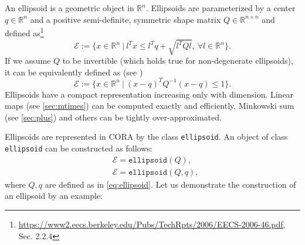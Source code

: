  \label{sec:ellipsoids}

An ellipsoid is a geometric object in $\mathbb{R}^n$. Ellipsoids are parameterized by a center $q \in \mathbb{R}^n$ and a positive semi-definite, symmetric shape matrix $Q\in \mathbb{R}^{n\times n}$ and defined as\footnote{\href{Ellipsoidal Toolbox (Technical Report)}{https://www2.eecs.berkeley.edu/Pubs/TechRpts/2006/EECS-2006-46.pdf},  Sec. 2.2.4}
\begin{equation} \label{eq:ellipsoid}
	\mathcal{E} := \Big\{x\in \mathbb{R}^n ~ \Big| ~ l^Tx \leq l^Tq + \sqrt{l^TQl}, \ \forall l \in \mathbb{R}^n \Big \}.
\end{equation}
If we assume $Q$ to be invertible (which holds true for non-degenerate ellipsoids), it can be equivalently defined as (see \cite[Definition 2.1.3]{Kurzhanskiy2006})
\begin{equation*}
	\mathcal{E} := \Big\{ x\in \mathbb{R}^n ~ \Big| ~ \left(x-q\right)^T Q^{-1}\left(x-q\right)\leq 1 \Big \}.
\end{equation*}
Ellipsoids have a compact representation increasing only with dimension. Linear maps (see \cref{sec:mtimes}) can be computed exactly and efficiently, Minkowski sum (see \cref{sec:plus}) and others can be tightly over-approximated.

Ellipsoids are represented in CORA by the class \texttt{ellipsoid}. An object of class \texttt{ellipsoid} can be constructed as follows:
\begin{equation*}
	\begin{split}
		& \mathcal{E} = \texttt{ellipsoid}(Q), \\
		& \mathcal{E} = \texttt{ellipsoid}(Q,q),
	\end{split}
\end{equation*} 
where $Q,q$ are defined as in \eqref{eq:ellipsoid}. Let us demonstrate the construction of an ellipsoid by an example:

\begin{center}
\begin{minipage}[t]{0.35\textwidth}
	\vspace{30pt}
	\footnotesize
	
\end{minipage}
\begin{minipage}[t]{0.3\textwidth}
	\vspace{0pt}
	\centering
\end{minipage}
\end{center}

